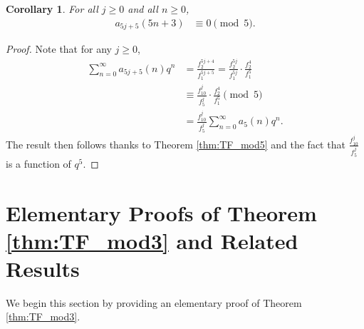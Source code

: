 \documentclass[10pt, reqno]{amsart}
\theoremstyle{theorem}
\newtheorem{corollary}[theorem]{Corollary}
\theoremstyle{definition}
\theoremstyle{example}
\begin{document}
\begin{corollary}
\label{cor:infinite_family_mod5}
For all $j\geq 0$ and all $n\geq 0$, 
\begin{align*}
a_{5j+5}(5n+3) &\equiv 0 \pmod{5}.
\end{align*}
\end{corollary}

\begin{proof}
Note that for any $j\geq 0$, 
\begin{align*}
\sum_{n=0}^\infty a_{5j+5}(n)q^n
&= 
\frac{f_2^{5j+4}}{f_1^{5j+5}} 
= 
\frac{f_2^{5j}}{f_1^{5j}}\cdot \frac{f_2^{4}}{f_1^{5}} \\
&\equiv 
\frac{f_{10}^{j}}{f_5^{j}}\cdot \frac{f_2^{4}}{f_1^{5}} \pmod{5} \\
&= 
\frac{f_{10}^{j}}{f_5^{j}}\sum_{n=0}^\infty a_{5}(n)q^n.
\end{align*}
The result then follows thanks to Theorem \ref{thm:TF_mod5} and the fact that $\frac{f_{10}^{j}}{f_5^{j}}$ is a function of $q^5$.  
\end{proof}

\section{Elementary Proofs of Theorem \ref{thm:TF_mod3} and Related Results}
\label{sec:proofs3}

We begin this section by providing an elementary proof of Theorem  \ref{thm:TF_mod3}.
\end{document}
